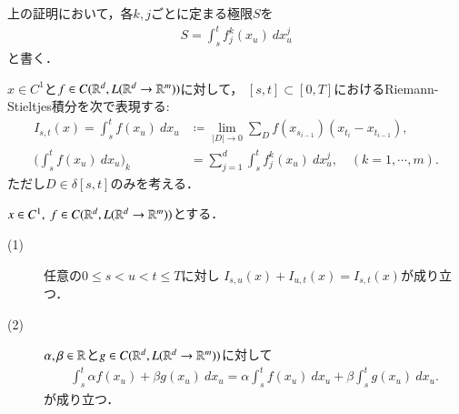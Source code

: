 上の証明において，各$k,j$ごとに定まる極限$S$を
\begin{align}
	S = \int_s^t f^k_j(x_u)\ dx^j_u
\end{align}
と書く．

\begin{screen}
	\begin{dfn}[$C^1$-級のパスに対する汎関数]
		$x \in C^1$と$f \in C(\mathbb{R}^d,L(\mathbb{R}^d \rightarrow \mathbb{R}^m))$に対して，
		$[s,t] \subset [0,T]$におけるRiemann-Stieltjes積分を次で表現する:
		\begin{align}
			I_{s,t}(x) = \int_s^t f(x_u)\ dx_u 
			&\coloneqq \lim_{|D| \to 0}
				\sum_{D} f(x_{s_{i-1}})(x_{t_i} - x_{t_{i-1}}), \\
			\biggl( \int_s^t f(x_u)\ dx_u \biggr)_k
			&= \sum_{j=1}^d \int_s^t f^k_j(x_u)\ dx^j_u,
			\quad (k = 1,\cdots,m).
		\end{align}
		ただし$D \in \delta[s,t]$のみを考える．
	\end{dfn}
\end{screen}

\begin{screen}
	\begin{thm}
	\label{thm:linearity_of_Riemann_Stieltjes_integral}
		$x \in C^1,\ f \in C(\mathbb{R}^d,L(\mathbb{R}^d \rightarrow \mathbb{R}^m))$とする．
		\begin{description}
			\item[(1)] 任意の$0 \leq s < u < t \leq T$に対し
				$I_{s,u}(x) + I_{u,t}(x) = I_{s,t}(x)$が成り立つ．
				
			\item[(2)] $\alpha,\beta \in \mathbb{R}$と$g \in C(\mathbb{R}^d,L(\mathbb{R}^d \rightarrow \mathbb{R}^m))$に対して
				\begin{align}
					\int_s^t \alpha f(x_u) + \beta g(x_u)\ dx_u
					= \alpha \int_s^t f(x_u)\ dx_u + \beta \int_s^t g(x_u)\ dx_u.
				\end{align}
				が成り立つ．
		\end{description}
	\end{thm}
\end{screen}

